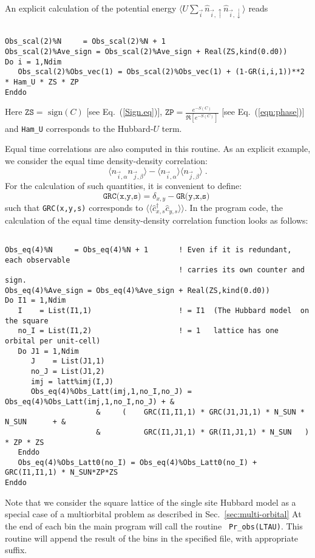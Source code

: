 An explicit calculation of the   potential energy  $ \langle U \sum_{\vec{i}}  \hat{n}_{\vec{i},\uparrow}   \hat{n}_{\vec{i},\downarrow}  \rangle $ reads 

\begin{lstlisting} 

Obs_scal(2)%N     = Obs_scal(2)%N + 1
Obs_scal(2)%Ave_sign = Obs_scal(2)%Ave_sign + Real(ZS,kind(0.d0))
Do i = 1,Ndim
   Obs_scal(2)%Obs_vec(1) = Obs_scal(2)%Obs_vec(1) + (1-GR(i,i,1))**2 * Ham_U * ZS * ZP
Enddo

\end{lstlisting} 
Here  $ \texttt{ZS} = \text{ sign} (C) $  [see Eq.~(\ref{Sign.eq})],  $ \texttt{ZP} =   \frac{e^{-S(C)}} {\Re \left[e^{-S(C)} \right]}   $ [see Eq.~(\ref{eqn:phase})] and  \texttt{Ham\_U}  corresponds to the Hubbard-$U$ term.


Equal time correlations  are also computed in this routine. As an explicit example, we  consider the equal time density-density correlation:
\begin{equation}
	 \langle n_{\vec{i},\alpha}   n_{\vec{j},\beta} \rangle   -  \langle n_{\vec{i},\alpha} \rangle  \langle    n_{\vec{j},\beta}  \rangle \;.
\end{equation} 
For the calculation of such quantities, it is convenient to  define: 
\begin{equation}
\label{GRC.eq}
	\texttt{GRC(x,y,s)}   =  \delta_{x,y}  - \texttt{GR(y,x,s)  }
\end{equation}
such that \texttt{GRC(x,y,s)}    corresponds to  $ \langle \langle  \hat{c}_{x,s}^{\dagger}\hat{c}_{y,s}^{\phantom\dagger} \rangle \rangle $. 
In the program code, the calculation of the equal time density-density correlation function looks as follows:
\begin{lstlisting} 

Obs_eq(4)%N     = Obs_eq(4)%N + 1       ! Even if it is redundant, each observable  
                                        ! carries its own counter and sign.
Obs_eq(4)%Ave_sign = Obs_eq(4)%Ave_sign + Real(ZS,kind(0.d0))  
Do I1 = 1,Ndim
   I    = List(I1,1)                    ! = I1  (The Hubbard model  on the square
   no_I = List(I1,2)                    ! = 1   lattice has one orbital per unit-cell)
   Do J1 = 1,Ndim                       
      J    = List(J1,1)
      no_J = List(J1,2)
      imj = latt%imj(I,J)
      Obs_eq(4)%Obs_Latt(imj,1,no_I,no_J) =  Obs_eq(4)%Obs_Latt(imj,1,no_I,no_J) + &
                     &     (    GRC(I1,I1,1) * GRC(J1,J1,1) * N_SUN * N_SUN      + &
                     &          GRC(I1,J1,1) * GR(I1,J1,1) * N_SUN   ) * ZP * ZS 
   Enddo
   Obs_eq(4)%Obs_Latt0(no_I) = Obs_eq(4)%Obs_Latt0(no_I) + GRC(I1,I1,1) * N_SUN*ZP*ZS
Enddo
\end{lstlisting} 
Note that we consider the  square lattice of the single site Hubbard model as a special case of a multiorbital problem as described in Sec.~\ref{sec:multi-orbital}
At the end of each bin  the main program will call the routine \texttt{ Pr\_obs(LTAU)}. This routine will append the result of the bins in the specified file,  with appropriate suffix. 

